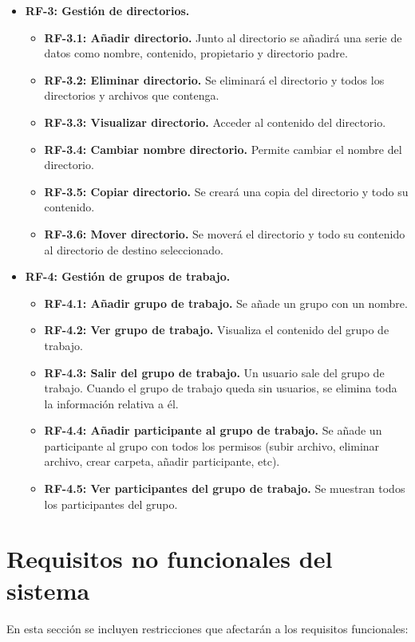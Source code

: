 \begin{itemize}
	\item \textbf{RF-3: Gestión de directorios.}
	\begin{itemize}
		\item \textbf{RF-3.1: Añadir directorio.} Junto al directorio se añadirá una serie de datos como nombre, contenido, propietario y directorio padre.
		\item \textbf{RF-3.2: Eliminar directorio.} Se eliminará el directorio y todos los directorios y archivos que contenga.
		\item \textbf{RF-3.3: Visualizar directorio.} Acceder al contenido del directorio.
		\item \textbf{RF-3.4: Cambiar nombre directorio.} Permite cambiar el nombre del directorio.
		\item \textbf{RF-3.5: Copiar directorio.} Se creará una copia del directorio y todo su contenido.
		\item \textbf{RF-3.6: Mover directorio.} Se moverá el directorio y todo su contenido al directorio de destino seleccionado.
	\end{itemize}
	
	\item \textbf{RF-4: Gestión de grupos de trabajo.}
	\begin{itemize}
		\item \textbf{RF-4.1: Añadir grupo de trabajo.} Se añade un grupo con un nombre.
		\item \textbf{RF-4.2: Ver grupo de trabajo.} Visualiza el contenido del grupo de trabajo.
		\item \textbf{RF-4.3: Salir del grupo de trabajo.} Un usuario sale del grupo de trabajo. Cuando el grupo de trabajo queda sin usuarios, se elimina toda la información relativa a él.
		\item \textbf{RF-4.4: Añadir participante al grupo de trabajo.} Se añade un participante al grupo con todos los permisos (subir archivo, eliminar archivo, crear carpeta, añadir participante, etc).
		\item \textbf{RF-4.5: Ver participantes del grupo de trabajo.} Se muestran todos los participantes del grupo.
	\end{itemize}
\end{itemize}

\section{Requisitos no funcionales del sistema}
En esta sección se incluyen restricciones que afectarán a los requisitos funcionales:

